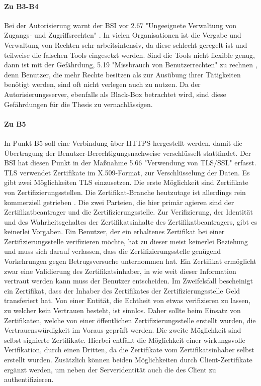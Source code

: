 \documentclass[11pt,a4paper]{report}
\begin{document}
\paragraph{Zu B3-B4} Bei der Autorisierung warnt der BSI vor 2.67 "Ungeeignete Verwaltung von Zugangs- und Zugriffsrechten" \cite{bsi_g2067}. In vielen Organisationen ist die Vergabe und Verwaltung von Rechten sehr arbeitsintensiv, da diese schlecht geregelt ist und teilweise die falschen Tools eingesetzt werden. Sind die Tools nicht flexible genug, dann ist mit der Gefährdung,  5.19 "Missbrauch von Benutzerrechten" zu rechnen \cite{bsi_g5019}, denn Benutzer, die mehr Rechte besitzen als zur Ausübung ihrer Tätigkeiten benötigt werden, sind oft nicht verlegen auch zu nutzen. Da der Autorisierungsserver, ebenfalls als Black-Box betrachtet wird, sind diese Gefährdungen für die Thesis zu vernachlässigen. 

\paragraph{Zu B5} In Punkt B5 soll eine Verbindung über HTTPS hergestellt werden, damit die Übertragung der Benutzer-Berechtigungsnachweise verschlüsselt stattfindet. Der BSI hat diesen Punkt in der Maßnahme 5.66 "Verwendung von TLS/SSL" \cite{bsi_m5066} erfasst. TLS verwendet Zertifikate im X.509-Format, zur Verschlüsselung der Daten. Es gibt zwei Möglichkeiten TLS einzusetzen. Die erste Möglichkeit sind Zertifikate von Zertifizierungsstellen. Die Zertifikat-Branche heutzutage ist allerdings rein kommerziell getrieben \cite[s.~50]{gutmann}. Die zwei Parteien, die hier primär agieren sind der Zertifikatbeantrager und die Zertifizierungsstelle. Zur Verifizierung, der Identität und des Wahrheitsgehaltes der Zertifikatsinhalte des Zertifikatbeantragers, gibt es keinerlei Vorgaben. Ein Benutzer, der ein erhaltenes Zertifikat bei einer Zertifizierungsstelle verifizieren möchte, hat zu dieser meist keinerlei Beziehung und muss sich darauf verlassen, dass die Zertifizierungsstelle genügend Vorkehrungen gegen Betrugsversuche unternommen hat. Ein Zertifikat ermöglicht zwar eine Validierung des Zertifikatsinhaber, in wie weit dieser Information vertraut werden kann muss der Benutzer entscheiden. Im Zweifelsfall bescheinigt ein Zertifikat, dass der Inhaber des Zertifikates der Zertifizierungsstelle Geld transferiert hat. Von einer Entität, die Echtheit von etwas verifizieren zu lassen, zu welcher kein Vertrauen besteht, ist sinnlos. Daher sollte beim Einsatz von Zertifikaten, welche von einer öffentlichen Zertifizierungsstelle erstellt wurden, die Vertrauenswürdigkeit im Voraus geprüft werden. Die zweite Möglichkeit sind selbst-signierte Zertifikate. Hierbei entfällt die Möglichkeit einer  wirkungsvolle Verifikation, durch einen Dritten, da die Zertifikate vom Zertifikatsinhaber selbst erstellt wurden. Zusätzlich können beiden Möglichkeiten durch Client-Zertifikate ergänzt werden, um neben der Serveridentität auch die des Client zu authentifizieren. 
\end{document}
